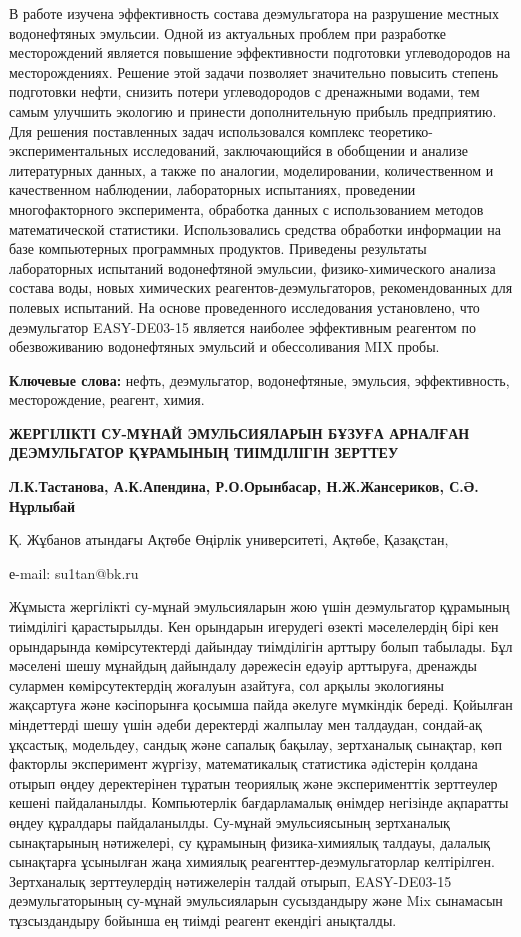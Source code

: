 В работе изучена эффективность состава деэмульгатора на разрушение
местных водонефтяных эмульсии. Одной из актуальных проблем при
разработке месторождений является повышение эффективности подготовки
углеводородов на месторождениях. Решение этой задачи позволяет
значительно повысить степень подготовки нефти, снизить потери
углеводородов с дренажными водами, тем самым улучшить экологию и
принести дополнительную прибыль предприятию. Для решения поставленных
задач использовался комплекс теоретико-экспериментальных исследований,
заключающийся в обобщении и анализе литературных данных, а также по
аналогии, моделировании, количественном и качественном наблюдении,
лабораторных испытаниях, проведении многофакторного эксперимента,
обработка данных с использованием методов математической статистики.
Использовались средства обработки информации на базе компьютерных
программных продуктов. Приведены результаты лабораторных испытаний
водонефтяной эмульсии, физико-химического анализа состава воды, новых
химических реагентов-деэмульгаторов, рекомендованных для полевых
испытаний. На основе проведенного исследования установлено, что
деэмульгатор EASY-DE03-15 является наиболее эффективным реагентом по
обезвоживанию водонефтяных эмульсий и обессоливания MIX пробы.

{\bfseries Ключевые слова:} нефть, деэмульгатор, водонефтяные, эмульсия,
эффективность, месторождение, реагент, химия.

\begin{center}
{\large\bfseries ЖЕРГІЛІКТІ СУ-МҰНАЙ ЭМУЛЬСИЯЛАРЫН БҰЗУҒА АРНАЛҒАН ДЕЭМУЛЬГАТОР
ҚҰРАМЫНЫҢ ТИІМДІЛІГІН ЗЕРТТЕУ}

{\bfseries Л.К.Тастанова, А.К.Апендина, Р.О.Орынбасар, Н.Ж.Жансериков, С.Ә. Нұрлыбай\envelope}

Қ. Жұбанов атындағы Ақтөбе Өңірлік университеті, Ақтөбе, Қазақстан,

е-mail: su1tan@bk.ru
\end{center}

Жұмыста жергілікті су-мұнай эмульсияларын жою үшін деэмульгатор
құрамының тиімділігі қарастырылды. Кен орындарын игерудегі өзекті
мәселелердің бірі кен орындарында көмірсутектерді дайындау тиімділігін
арттыру болып табылады. Бұл мәселені шешу мұнайдың дайындалу дәрежесін
едәуір арттыруға, дренажды сулармен көмірсутектердің жоғалуын азайтуға,
сол арқылы экологияны жақсартуға және кәсіпорынға қосымша пайда әкелуге
мүмкіндік береді. Қойылған міндеттерді шешу үшін әдеби деректерді
жалпылау мен талдаудан, сондай-ақ ұқсастық, модельдеу, сандық және
сапалық бақылау, зертханалық сынақтар, көп факторлы эксперимент жүргізу,
математикалық статистика әдістерін қолдана отырып өңдеу деректерінен
тұратын теориялық және эксперименттік зерттеулер кешені пайдаланылды.
Компьютерлік бағдарламалық өнімдер негізінде ақпаратты өңдеу құралдары
пайдаланылды. Су-мұнай эмульсиясының зертханалық сынақтарының
нәтижелері, су құрамының физика-химиялық талдауы, далалық сынақтарға
ұсынылған жаңа химиялық реагенттер-деэмульгаторлар келтірілген.
Зертханалық зерттеулердің нәтижелерін талдай отырып, EASY-DE03-15
деэмульгаторының су-мұнай эмульсияларын сусыздандыру және Mix сынамасын
тұзсыздандыру бойынша ең тиімді реагент екендігі анықталды.

